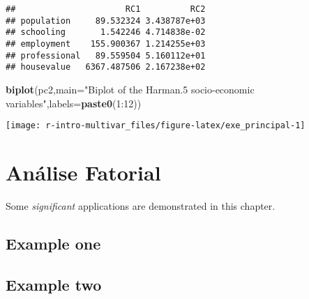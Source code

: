\documentclass[]{book}
\newenvironment{Shaded}{\begin{snugshade}}{\end{snugshade}}
\newcommand{\KeywordTok}[1]{\textcolor[rgb]{0.13,0.29,0.53}{\textbf{{#1}}}}
\newcommand{\DataTypeTok}[1]{\textcolor[rgb]{0.13,0.29,0.53}{{#1}}}
\newcommand{\DecValTok}[1]{\textcolor[rgb]{0.00,0.00,0.81}{{#1}}}
\newcommand{\StringTok}[1]{\textcolor[rgb]{0.31,0.60,0.02}{{#1}}}
\newcommand{\NormalTok}[1]{{#1}}
\begin{document}
\begin{verbatim}
##                      RC1          RC2
## population     89.532324 3.438787e+03
## schooling       1.542246 4.714838e-02
## employment    155.900367 1.214255e+03
## professional   89.559504 5.160112e+01
## housevalue   6367.487506 2.167238e+02
\end{verbatim}

\begin{Shaded}
\begin{Highlighting}[]
\KeywordTok{biplot}\NormalTok{(pc2,}\DataTypeTok{main=}\StringTok{"Biplot of the Harman.5 socio-economic variables"}\NormalTok{,}\DataTypeTok{labels=}\KeywordTok{paste0}\NormalTok{(}\DecValTok{1}\NormalTok{:}\DecValTok{12}\NormalTok{))}
\end{Highlighting}
\end{Shaded}

\begin{center}\texttt{[image: r-intro-multivar\_files/figure-latex/exe\_principal-1]} \end{center}

\chapter{Análise Fatorial}\label{FA}

Some \emph{significant} applications are demonstrated in this chapter.

\section{Example one}\label{example-one}

\section{Example two}\label{example-two}


\end{document}
